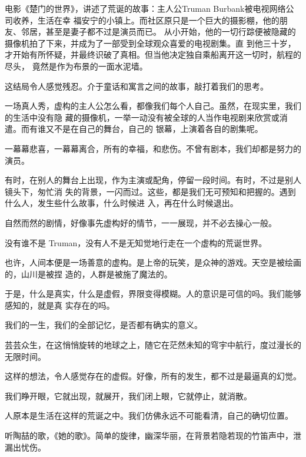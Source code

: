 \documentclass[12pt,a4paper]{article}
\begin{document}
	\endwriting



		电影《楚门的世界》，讲述了荒诞的故事：主人公Truman Burbank被电视网络公司收养，生活在幸
	福安宁的小镇上。而社区原只是一个巨大的摄影棚，他的朋友、邻居，甚至是妻子都不过是演员而已。
	从小开始，他的一切行踪便被隐藏的摄像机拍了下来，并成为了一部受到全球观众喜爱的电视剧集。直
	到他三十岁，才开始有所怀疑，并最终识破了真相。但当他决定独自乘船离开这一切时，航程的尽头，
	竟然是作为布景的一面水泥墙。

		这结局令人感觉残忍。介于童话和寓言之间的故事，敲打着我们的思考。

		一场真人秀，虚构的主人公怎么看，都像我们每个人自己。虽然，在现实里，我们的生活中没有隐
	藏的摄像机，一举一动没有被全球的人当作电视剧来欣赏或消遣。而有谁又不是在自己的舞台，自己的
	银幕，上演着各自的剧集呢。

		一幕幕悲喜，一幕幕离合，所有的幸福，和悲伤。不曾有剧本，我们却都是努力的演员。

		有时，在别人的舞台上出现，作为主演或配角，停留一段时间。有时，不过是别人镜头下，匆忙消
	失的背景，一闪而过。这些，都是我们无可预知和把握的。遇到什么人，发生些什么故事，什么时候进
	入，再在什么时候退出。

		自然而然的剧情，好像事先虚构好的情节，一一展现，并不必去操心一般。

		没有谁不是 Truman，没有人不是无知觉地行走在一个虚构的荒诞世界。

		也许，人间本便是一场善意的虚构。是上帝的玩笑，是众神的游戏。天空是被绘画的，山川是被捏
	造的，人群是被施了魔法的。

		于是，什么是真实，什么是虚假，界限变得模糊。人的意识是可信的吗。我们能够感知的，就是真
	实存在的吗。

		我们的一生，我们的全部记忆，是否都有确实的意义。\par
		芸芸众生，在这悄悄旋转的地球之上，随它在茫然未知的穹宇中航行，度过漫长的无限时间。\par
		这样的想法，令人感觉存在的虚假。好像，所有的发生，都不过是最逼真的幻觉。\par
		我们睁开眼，它就出现，就展开，我们闭上眼，它就停止，就消散。\par
		人原本是生活在这样的荒诞之中。我们仿佛永远不可能看清，自己的确切位置。

	\endwriting



		听陶喆的歌，《她的歌》。简单的旋律，幽深华丽，在背景若隐若现的竹笛声中，泄漏出忧伤。
\end{document}
